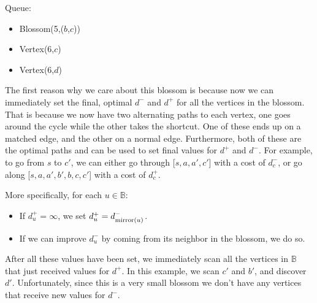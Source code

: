 \begin{minipage}{.7\linewidth}
\end{minipage}\hfill%
\begin{minipage}{.26\linewidth}
    \vspace{2cm}
    Queue:
    \begin{itemize}
        \item Blossom(5,($b$,$c$))
        \item Vertex(6,$c$)
        \item Vertex(6,$d$)
    \end{itemize}
\end{minipage}

The first reason why we care about this blossom is because now we can immediately set the final, optimal $d^-$ and $d^+$ for all the vertices in the blossom. That is because we now have two alternating paths to each vertex, one goes around the cycle while the other takes the shortcut. One of these ends up on a matched edge, and the other on a normal edge. Furthermore, both of these are the optimal paths and can be used to set final values for $d^+$ and $d^-$. For example, to go from $s$ to $c'$, we can either go through [$s,a,a',c'$] with a cost of $d^-_c$, or go along [$s,a,a',b',b,c,c'$] with a cost of $d^+_c$.

More specifically, for each $u \in \mathbb{B}$: \begin{itemize}
    \item If $d^+_u = \infty$, we set $d^+_u = d^-_{\operatorname{mirror}(u)}$.
    \item If we can improve $d^-_u$ by coming from its neighbor in the blossom, we do so.
\end{itemize}
After all these values have been set, we immediately scan all the vertices in $\mathbb{B}$ that just received values for $d^+$. In this example, we scan $c'$ and $b'$, and discover $d'$. Unfortunately, since this is a very small blossom we don't have any vertices that receive new values for $d^-$.

